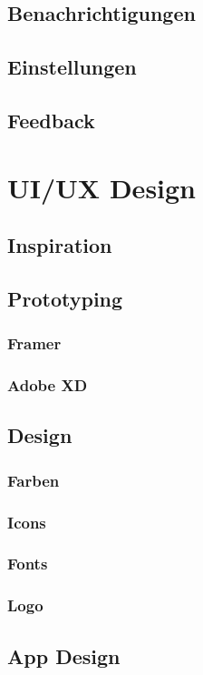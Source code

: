 \subsection{Benachrichtigungen}
\subsection{Einstellungen}
\subsection{Feedback}


\section{UI/UX Design}
\subsection{Inspiration}

\subsection{Prototyping}
\subsubsection{Framer}
\subsubsection{Adobe XD}


\subsection{Design}
\subsubsection{Farben}
\subsubsection{Icons}
\subsubsection{Fonts}
\subsubsection{Logo}
\subsection{App Design}
